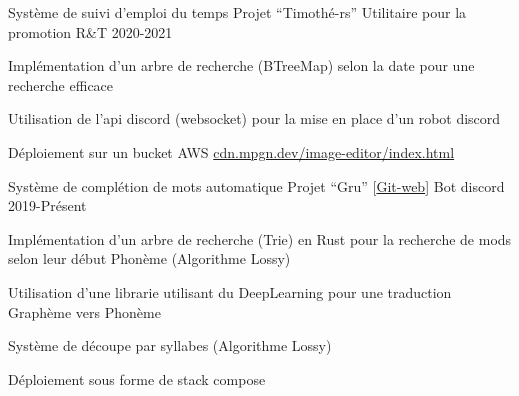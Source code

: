 \begin{cventries}
  \cventry
    {Système de suivi d'emploi du temps}
    {Projet ``Timothé-rs'' \href{https://github.com/MatthieuCoder/Timothe-rs.git}{\faGithubSquare}}
    {Utilitaire pour la promotion R\&T}
    {2020-2021}
    {
      \begin{cvitems}
        \item {Implémentation d'un arbre de recherche (BTreeMap) selon la date pour une recherche efficace} 
        \item {Utilisation de l'api discord (websocket) pour la mise en place d'un robot discord}
        \item {Déploiement sur un bucket AWS \href{https://cdn.mpgn.dev/image-editor/index.html}{cdn.mpgn.dev/image-editor/index.html}}
      \end{cvitems}
    }
  \cventry
    {Système de complétion de mots automatique}
    {Projet ``Gru'' [\href{https://git.puffer.fish/?p=matthieu/gru.git;a=summary}{Git-web}]}
    {Bot discord}
    {2019-Présent}
    {
      \begin{cvitems}
        \item {Implémentation d'un arbre de recherche (Trie) en Rust pour la recherche de mods selon leur début Phonème (Algorithme Lossy)} 
        \item {Utilisation d'une librarie utilisant du DeepLearning pour une traduction Graphème vers Phonème}
        \item {Système de découpe par syllabes (Algorithme Lossy)}
        \item {Déploiement sous forme de stack compose}
      \end{cvitems}
    }
\end{cventries}
